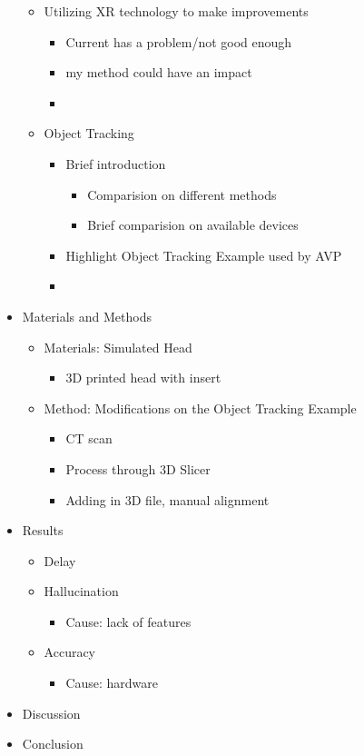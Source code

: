 \documentclass[12pt]{spieman}  %
\begin{document}
\begin{itemize}
\begin{itemize}
\begin{itemize}
        \end{itemize}
        \item Utilizing XR technology to make improvements
        \begin{itemize}
            \item Current has a problem/not good enough
            \item my method could have an impact
        \item 
    \end{itemize}
    \item Object Tracking
    \begin{itemize}
        \item Brief introduction 
        \begin{itemize}
            \item Comparision on different methods
            \item Brief comparision on available devices
        \end{itemize}
        \item Highlight Object Tracking Example used by AVP
        \item 
        \end{itemize}
    \end{itemize}
    \item Materials and Methods
    \begin{itemize}
        \item Materials: Simulated Head
        \begin{itemize}
            \item 3D printed head with insert
        \end{itemize}
        \item Method: Modifications on the Object Tracking Example
        \begin{itemize}
            \item CT scan
            \item Process through 3D Slicer
            \item Adding in 3D file, manual alignment
        \end{itemize}
    \end{itemize}
    \item Results
    \begin{itemize}
        \item Delay
        \item Hallucination
        \begin{itemize}
            \item Cause: lack of features
        \end{itemize}
        \item Accuracy
        \begin{itemize}
            \item Cause: hardware
        \end{itemize}
    \end{itemize}
    \item Discussion
    \item Conclusion
\end{itemize}
\end{document}
